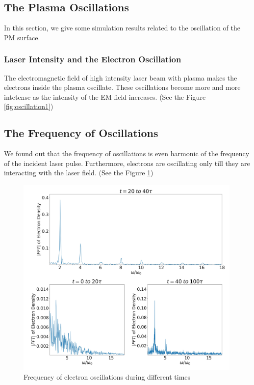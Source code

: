 \documentclass[12pt]{article}
\newenvironment{changemargin}[2]{
\begin{list}{}{
\setlength{\topsep}{0pt}
\setlength{\leftmargin}{#1}
\setlength{\rightmargin}{#2}
\setlength{\listparindent}{\parindent}
\setlength{\itemindent}{\parindent}
\setlength{\parsep}{\parskip}
}
\item[]}{\end{list}}
\begin{document}
\begin{changemargin}{-2cm}{-2cm}
    \subsection{The Plasma Oscillations}
    In this section, we give some simulation results related to the oscillation of the PM surface.
    \subsubsection{Laser Intensity and the Electron Oscillation}
    The electromagnetic field of high intensity laser beam with plasma makes the electrons inside the plasma oscillate. These oscillations become more and more intetense as the intensity of the EM field increases. (See the Figure \ref{fig:oscillation1})
    \subsection{The Frequency of Oscillations}
    We found out that the frequency of oscillations is even harmonic of the frequency of the incident laser pulse. Furthermore, electrons are oscillating only till they are interacting with the laser field. (See the Figure \ref{fig:oscillation2})
    \begin{figure}[h]
        \centering
        \includegraphics[width=0.99\textwidth, height=0.9\textwidth]{images/oscillation2.jpg}
        \caption{Frequency of electron oscillations during different times}
        \label{fig:oscillation2}
    \end{figure}


\end{changemargin}
\end{document}
